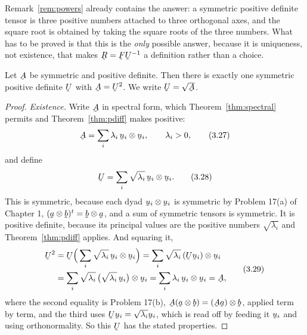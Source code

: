 Remark~\ref{rem:powers} already contains the answer: a symmetric positive
definite tensor is three positive numbers attached to three orthogonal
axes, and the square root is obtained by taking the square roots of the
three numbers. What has to be proved is that this is the \emph{only}
possible answer, because it is uniqueness, not existence, that makes
$\bR=\bF\bU^{-1}$ a definition rather than a choice.

\begin{theorem}\label{thm:sqrt}
Let $\bA$ be symmetric and positive definite. Then there is exactly one
symmetric positive definite $\bU$ with $\bA=\bU^{2}$. We write
$\bU=\sqrt{\bA}$.
\end{theorem}

\begin{proof}
\emph{Existence.} Write $\bA$ in spectral form, which
Theorem~\ref{thm:spectral} permits and Theorem~\ref{thm:pdiff} makes
positive:
\begin{equation}
   \bA=\sum_{i}\lambda_{i}\,\bu_{i}\otimes\bu_{i},
   \qquad \lambda_{i}>0,
   \tag{3.27}\label{eq:3.27}
\end{equation}
and define
\begin{equation}
   \bU=\sum_{i}\sqrt{\lambda_{i}}\,\bu_{i}\otimes\bu_{i}.
   \tag{3.28}\label{eq:3.28}
\end{equation}
This is symmetric, because each dyad $\bu_{i}\otimes\bu_{i}$ is symmetric
by Problem 17(a) of Chapter 1, $(\ba\otimes\bb)^{t}=\bb\otimes\ba$, and a
sum of symmetric tensors is symmetric. It is positive definite, because
its principal values are the positive numbers $\sqrt{\lambda_{i}}$ and
Theorem~\ref{thm:pdiff} applies. And squaring it,
\begin{equation}
\begin{aligned}
   \bU^{2}&=\bU\Big(\sum_{i}\sqrt{\lambda_{i}}\,\bu_{i}\otimes\bu_{i}\Big)
          =\sum_{i}\sqrt{\lambda_{i}}\,(\bU\bu_{i})\otimes\bu_{i}\\
          &=\sum_{i}\sqrt{\lambda_{i}}\,
            \big(\sqrt{\lambda_{i}}\,\bu_{i}\big)\otimes\bu_{i}
          =\sum_{i}\lambda_{i}\,\bu_{i}\otimes\bu_{i}=\bA,
\end{aligned}
   \tag{3.29}\label{eq:3.29}
\end{equation}
where the second equality is Problem 17(b), $\bA(\ba\otimes\bb)
=(\bA\ba)\otimes\bb$, applied term by term, and the third uses
$\bU\bu_{i}=\sqrt{\lambda_{i}}\bu_{i}$, which is read off  by
feeding it $\bu_{i}$ and using orthonormality. So this $\bU$ has the
stated properties.


\end{proof}

